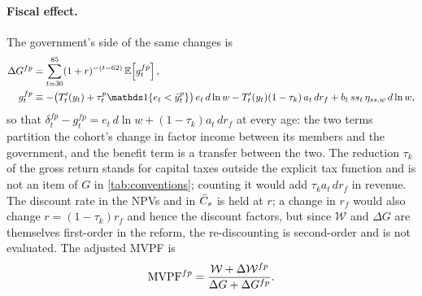 \paragraph{Fiscal effect.}
The government's side of the same changes is
\begin{equation}\label{eq:ge-fiscal}
\begin{aligned}
\Delta G^{fp}&=\sum_{t=30}^{85}(1+r)^{-(t-62)}\,\E\!\left[g^{fp}_t\right],\\
g^{fp}_t&\equiv-\bigl(T'_t(y_t)+\tau^{p}_t\ind{e_t<\bar y^{p}_t}\bigr)\,e_t\,d\ln w-T'_t(y_t)(1-\tau_k)\,a_t\,dr_f+b_t\,ss_t\,\eta_{ss,w}\,d\ln w ,
\end{aligned}
\end{equation}
so that $\delta^{fp}_t-g^{fp}_t=e_t\,d\ln w+(1-\tau_k)a_t\,dr_f$ at every age: the two terms partition the cohort's change in factor income between its members and the government, and the benefit term is a transfer between the two. The reduction $\tau_k$ of the gross return stands for capital taxes outside the explicit tax function and is not an item of $G$ in \autoref{tab:conventions}; counting it would add $\tau_k a_t\,dr_f$ in revenue. The discount rate in the NPVs and in $\bar{C}_{s}$ is held at $r$; a change in $r_f$ would also change $r=(1-\tau_k)r_f$ and hence the discount factors, but since $\mathcal{W}$ and $\Delta G$ are themselves first-order in the reform, the re-discounting is second-order and is not evaluated. The adjusted MVPF is
\begin{equation}\label{eq:ge-mvpf}
\operatorname{MVPF}^{fp}=\frac{\mathcal{W}+\Delta\mathcal{W}^{fp}}{\Delta G+\Delta G^{fp}} .
\end{equation}

